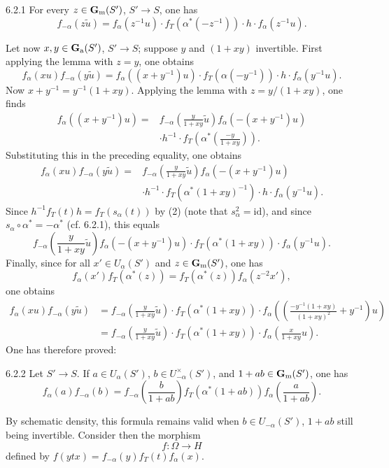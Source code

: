 \begin{lemma}{6.2.1}\label{XX.6.2.1}
For every $z\in\mathbf{G}_{\mathrm{m}}(S')$, $S'\to S$, one has
\[
f_{-\alpha}(z\widetilde u)=f_\alpha(z^{-1}u)\cdot f_T(\alpha^*(-z^{-1}))\cdot h\cdot f_\alpha(z^{-1}u).
\]
\end{lemma}
Let now $x,y\in\mathbf{G}_{\mathrm{a}}(S')$, $S'\to S$; suppose $y$ and $(1+xy)$ invertible. First applying the lemma with $z=y$, one obtains{\renewcommand{\thefootnote}{(38)}}
\[
f_\alpha(xu)f_{-\alpha}(y\widetilde u)=f_\alpha((x+y^{-1})u)\cdot f_T(\alpha(-y^{-1}))\cdot h\cdot f_\alpha(y^{-1}u).
\]
Now $x+y^{-1}=y^{-1}(1+xy)$. Applying the lemma with $z=y/(1+xy)$, one finds
\[
\begin{split}
f_\alpha((x+y^{-1})u)={}&f_{-\alpha}\left(\frac y{1+xy}\widetilde u\right)f_\alpha(-(x+y^{-1})u)\\
&\cdot h^{-1}\cdot f_T\left(\alpha^*\left(\frac{-y}{1+xy}\right)\right).
\end{split}
\]
Substituting this in the preceding equality, one obtains
\[
\begin{split}
f_\alpha(xu)f_{-\alpha}(y\widetilde u)={}&f_{-\alpha}\left(\frac y{1+xy}\widetilde u\right)f_\alpha(-(x+y^{-1})u)\\
&\cdot h^{-1}\cdot f_T(\alpha^*(1+xy)^{-1})\cdot h\cdot f_\alpha(y^{-1}u).
\end{split}
\]
Since $h^{-1}f_T(t)h=f_T(s_\alpha(t))$ by (2) (note that $s_\alpha^2=\mathrm{id}$), and since $s_\alpha\circ\alpha^*=-\alpha^*$ (cf. 6.2.1), this equals
\[
f_{-\alpha}\left(\frac y{1+xy}\widetilde u\right)f_\alpha(-(x+y^{-1})u)\cdot f_T(\alpha^*(1+xy))\cdot f_\alpha(y^{-1}u).
\]
Finally, since for all $x'\in U_\alpha(S')$ and $z\in\mathbf{G}_{\mathrm{m}}(S')$, one has
\[
f_\alpha(x')f_T(\alpha^*(z))=f_T(\alpha^*(z))f_\alpha(z^{-2}x'),
\]
one obtains
\[
\begin{aligned}
f_\alpha(xu)f_{-\alpha}(y\widetilde u)
&=f_{-\alpha}\left(\frac y{1+xy}\widetilde u\right)\cdot f_T(\alpha^*(1+xy))\cdot
 f_\alpha\left(\left(\frac{-y^{-1}(1+xy)}{(1+xy)^2}+y^{-1}\right)u\right)\\
&=f_{-\alpha}\left(\frac y{1+xy}\widetilde u\right)\cdot f_T(\alpha^*(1+xy))\cdot f_\alpha\left(\frac x{1+xy}u\right).
\end{aligned}
\]
One has therefore proved:
\begin{lemma}{6.2.2}\label{XX.6.2.2}
Let $S'\to S$. If $a\in U_\alpha(S')$, $b\in U_{-\alpha}^\times(S')$, and $1+ab\in\mathbf{G}_{\mathrm{m}}(S')$, one has
\[
f_\alpha(a)f_{-\alpha}(b)=f_{-\alpha}\left(\frac b{1+ab}\right)f_T(\alpha^*(1+ab))f_\alpha\left(\frac a{1+ab}\right).
\]
\end{lemma}
By schematic density, this formula remains valid when $b\in U_{-\alpha}(S')$, $1+ab$ still being invertible. Consider then the morphism
\[
f:\Omega\to H
\]
defined by $f(ytx)=f_{-\alpha}(y)f_T(t)f_\alpha(x)$.

